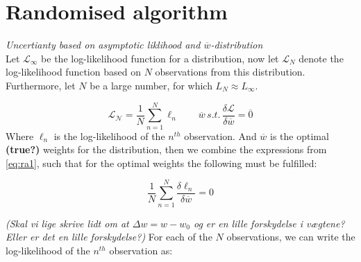 \section{Randomised algorithm}
\emph{Uncertianty based on asymptotic liklihood and $\overline{w}$-distribution}\\
Let $\mathcal{L}_\infty$ be the log-likelihood function for a distribution, now let $\mathcal{L}_N$ denote the log-likelihood function based on $N$ observations from this distribution. Furthermore, let $N$ be a large number, for which $L_N \approx L_\infty$. 

\begin{equation}
\mathcal{L_N} = \frac{1}{N} \sum_{n=1}^N \ell_n \qquad \overline{w} \, s.t. \, \frac{\delta \mathcal{L}}{\delta \overline{w}} = \overline{0} \label{eq:ra1}
\end{equation}
Where $\ell_n$ is the log-likelihood of the $n^{th}$ observation. And $\overline{w}$ is the optimal \textbf{(true?)} weights for the distribution, then we combine the expressions from \eqref{eq:ra1}, such that for the optimal weights the following must be fulfilled:

\begin{equation}
\frac{1}{N} \sum_{n = 1}^N \frac{\delta \ell_n}{\delta \overline{w}} = 0 \label{eq:ra2}
\end{equation}

\emph{(Skal vi lige skrive lidt om at $\Delta w = w-w_0$ og er en lille forskydelse i vægtene? Eller er det en lille forskydelse?) }
For each of the $N$ observations, we can write the log-likelihood of the $n^{th}$ observation as:

